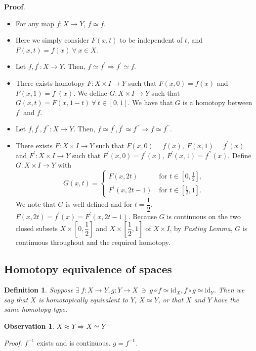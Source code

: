 \documentclass[a4paper,11pt]{article}
\newcommand{\tends}{\rightarrow}
\newcommand{\id}{\text{id}}
\newcommand{\dash}{^\prime}
\newcommand{\ddash}{^{\prime\prime}}
\newtheorem{defn}[thm]{Definition}
\newtheorem{obs}[thm]{Observation}
\begin{document}
\textbf{Proof}. \begin{itemize}
  \item[(i)]For any map $f:X\tends Y$, $f\simeq f$.
  \item[] Here we simply consider $F(x,t)$ to be independent of $t$, and $F(x,t)=f(x)~\forall~x\in X$.
  \item[(ii)]Let $f, f\dash:X\tends Y$. Then, $f\simeq f\dash\Rightarrow f\dash\simeq f$.
  \item[]There exists homotopy $F:X\times I\rightarrow Y$ such that $F(x, 0)=f(x)$ and $F(x,1)=f\dash(x)$. We define $G:X\times I\rightarrow Y$ such that $G(x,t)=F(x, 1-t)~\forall~t\in[0,1]$. We have that $G$ is a homotopy between $f\dash$ and $f$.
  \item[(iii)]Let $f, f\dash, f\ddash:X\tends Y$. Then, $f\simeq f\dash,f\dash\simeq f\ddash\Rightarrow f\simeq f\ddash$.
  \item[]There exists $F:X\times I\tends Y$ such that $F(x,0)=f(x),~F(x,1)=f\dash(x)$ and $F\dash:X\times I\tends Y$ such that $F\dash(x,0)=f\dash(x),~F\dash(x,1)=f\ddash(x)$. Define $G:X\times I\tends Y$ with
$$G(x,t)=\begin{cases}
  F(x,2t)~&\text{for }t\in\left[0, \frac{1}{2}\right],\\
  F\dash(x,2t-1)~&\text{for }t\in\left[\frac{1}{2}, 1\right].
\end{cases}$$
We note that $G$ is well-defined and for $t=\dfrac{1}{2}$, $F(x,2t)=f\dash(x)=F\dash(x, 2t-1)$. Because $G$ is continuous on the two closed subsets $X\times\left[0, \dfrac{1}{2}\right]$ and $X\times\left[\dfrac{1}{2}, 1\right]$ of $X\times I$, by \emph{Pasting Lemma}, $G$ is continuous throughout and the required homotopy.\Square 
\end{itemize}


\subsection{Homotopy equivalence of spaces}
\begin{defn}
Suppose $\exists~f:X\tends Y,g:Y\tends X~\ni~g\circ f\simeq\id_X, f\circ g\simeq\id_Y$. Then we say that $X$ is homotopically equivalent to $Y$, $X\simeq Y$, or that $X$ and $Y$ have the same homotopy type.
\end{defn}

\begin{obs}
$X\approx Y\Rightarrow X\simeq Y$
\end{obs}

\textit{Proof.} $f^{-1}$ exists and is continuous. $g=f^{-1}$.
\end{document}
